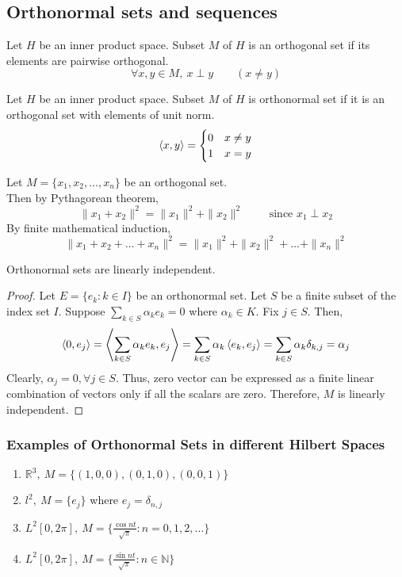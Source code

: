 \subsection{Orthonormal sets and sequences}
\begin{definition}[orthogonal]
	Let $H$ be an inner product space.
	Subset $M$ of $H$ is an orthogonal set if its elements are pairwise orthogonal.
	\[ \forall x,y \in M,\ x \perp y \qquad (x \ne y) \]
\end{definition}
\begin{definition}[orthonormal]
	Let $H$ be an inner product space.
	Subset $M$ of $H$ is orthonormal set if it is an orthogonal set with elements of unit norm.
	\[ \left\langle x,y \right\rangle = \begin{cases} 0 & x \ne y \\ 1 & x = y \end{cases} \]
\end{definition}

\begin{remark}
	Let $M = \{ x_1,x_2,\dots,x_n\}$ be an orthogonal set.\\
	Then by Pythagorean theorem,
	\[ \|x_1 + x_2\|^2 = \|x_1\|^2 + \|x_2\|^2 \qquad \text{ since } x_1 \perp x_2 \]
	By finite mathematical induction,
	\[ \|x_1 + x_2 + \dots + x_n\|^2 = \|x_1\|^2 + \|x_2\|^2 + \dots + \|x_n\|^2 \]
\end{remark}

\begin{lemma}
	Orthonormal sets are linearly independent.
\end{lemma}
\begin{proof}
	Let $E = \{e_k : k \in I\}$ be an orthonormal set.
	Let $S$ be a finite subset of the index set $I$.
	Suppose $\displaystyle \sum_{k \in S} \alpha_k e_k = 0$ where $\alpha_k \in K$.
	Fix $j \in S$.
	Then,
		\[ \left\langle 0,e_j \right\rangle = \left\langle \sum_{k \in S} \alpha_k e_k,e_j \right\rangle 
		 = \sum_{k \in S} \alpha_k \left\langle e_k,e_j \right\rangle = \sum_{k \in S} \alpha_k \delta_{k,j} = \alpha_j \]
	Clearly, $\alpha_j = 0, \forall j \in S$.
	Thus, zero vector can be expressed as a finite linear combination of vectors only if all the scalars are zero.
	Therefore, $M$ is linearly independent.
\end{proof}

\subsubsection{Examples of Orthonormal Sets in different Hilbert Spaces}
\begin{enumerate}
	\item $\mathbb{R}^3,\ M = \{(1,0,0),(0,1,0),(0,0,1)\}$
	\item $l^2,\ M = \{e_j\}$ where $e_j =\delta_{n,j}$
	\item {\color{red}$L^2[0,2\pi],\ M = \{ \frac{\cos nt}{\sqrt{\pi}} : n =0,1,2,\dots \}$}
	\item {\color{red}$L^2[0,2\pi],\ M = \{ \frac{\sin nt}{\sqrt{\pi}} : n \in \mathbb{N} \}$}
\end{enumerate}

